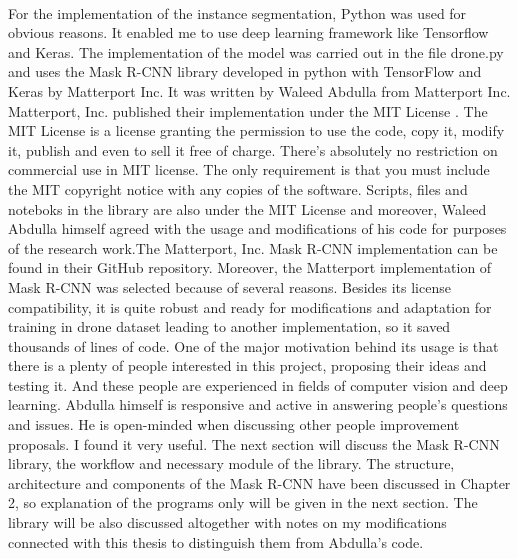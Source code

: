 \paragraph{}
For the implementation of the instance segmentation, Python was used for obvious reasons. It enabled me to use deep learning framework like Tensorflow and Keras. The implementation of the model was carried out in the file drone.py and uses the Mask R-CNN library developed in python with TensorFlow and Keras by Matterport Inc. It was written by Waleed Abdulla from Matterport Inc. Matterport, Inc. published their implementation under the MIT License \cite{X}. The MIT License is a license granting the permission to use the code, copy it, modify it, publish and even to sell it free of charge.
There's absolutely no restriction on commercial use in MIT license. The only requirement is that you must include the MIT copyright notice with any copies of the software. Scripts, files and noteboks in the library are also under the MIT License and moreover, Waleed Abdulla himself agreed with the usage and modifications of his code for purposes of the research work.The Matterport, Inc. Mask R-CNN implementation can be found in their GitHub repository.
Moreover, the Matterport implementation of Mask R-CNN was selected because of several reasons. Besides its license compatibility, it is quite robust and ready for modifications and adaptation for training in drone dataset leading to another implementation, so it saved thousands of lines of code. One of the major motivation behind its usage is that there is a plenty of people interested in this project, proposing their ideas and testing it. And these people are experienced in fields of computer vision and deep learning. Abdulla himself is responsive and active in answering people’s questions and issues. He is open-minded when discussing other people improvement proposals. I found it very useful.
The next section will discuss the Mask R-CNN library, the workflow and necessary module of the library. The structure, architecture and components of the Mask R-CNN have been discussed in Chapter 2, so explanation of the programs only will be given in the next section. The library will be also discussed altogether with notes on my modifications connected with this thesis to distinguish them from Abdulla’s code.

